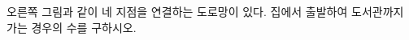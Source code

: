 \noindent\begin{minipage}[t]{0.58\linewidth}\vspace{0pt}\raggedright 오른쪽 그림과 같이 네 지점을 연결하는 도로망이 있다. 집에서 출발하여 도서관까지 가는 경우의 수를 구하시오. \end{minipage}\hfill\begin{minipage}[t]{0.4\linewidth}\vspace{0pt}\centering \resizebox{\ifdim\width>\linewidth\linewidth\else\width\fi}{!}{}\end{minipage}\par
